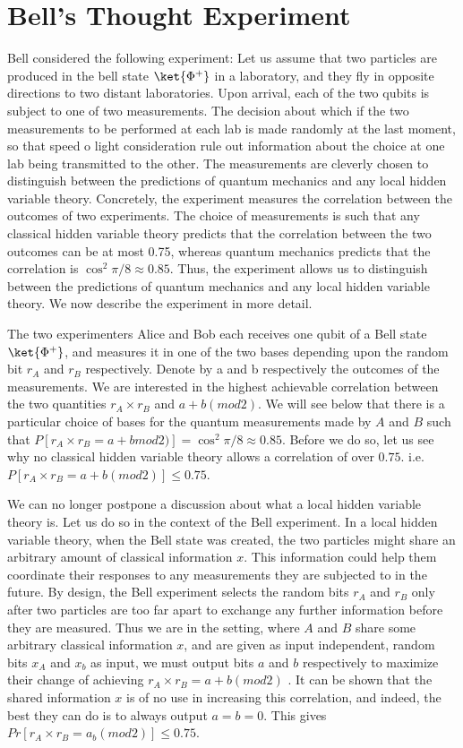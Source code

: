 \documentclass[12pt, oneside]{book}
\theoremstyle{definition}
\theoremstyle{definition}
\theoremstyle{remark}
\begin{document}
\section{Bell's Thought Experiment}
Bell considered the following experiment: Let us assume that two particles are produced in the bell state $\ket{\Phi^{+}}$ in a laboratory, and they fly in opposite directions to two distant laboratories. Upon arrival, each of the two qubits is subject to one of two measurements. The decision about which if the two measurements to be performed at each lab is made randomly at the last moment, so that speed o light consideration rule out information about the choice at one lab being transmitted to the other. The measurements are cleverly chosen to distinguish between the predictions of quantum mechanics and any local hidden variable theory. Concretely, the experiment measures the correlation between the outcomes of two experiments. The choice of measurements is such that any classical hidden variable theory predicts that the correlation between the two outcomes can be at most 0.75, whereas quantum mechanics predicts that the correlation is $\cos^2 \pi/8 \approx 0.85$. Thus, the experiment allows us to distinguish between the predictions of quantum mechanics and any local hidden variable theory. We now describe the experiment in more detail. 

The two experimenters Alice and Bob each receives one qubit of a Bell state $\ket{\Phi^{+}}$, and measures it in one of the two bases depending upon the random bit $r_A$ and $r_B$ respectively. Denote by a and b respectively the outcomes of the measurements. We are interested in the highest achievable correlation between the two quantities $r_A \times r_B$ and $a+b(mod 2)$. We will see below that there is a particular choice of bases for the quantum measurements made by $A$ and $B$ such that $P[r_A\times r_B=a+bmod2)]=\cos^2 \pi/8 \approx 0.85$. Before we do so, let us see why no classical hidden variable theory allows a correlation of over $0.75$. i.e. $P[r_A \times r_B = a+b(mod2)]\leq 0.75$. 

We can no longer postpone a discussion about what a local hidden variable theory is. Let us do so in the context of the Bell experiment. In a local hidden variable theory, when the Bell state was created, the two particles might share an arbitrary amount of classical information $x$. This information could help them coordinate their responses to any measurements they are subjected to in the future. By design, the Bell experiment selects the random bits $r_A$ and $r_B$ only after two particles are too far apart to exchange any further information before they are measured. Thus we are in the setting, where $A$ and $B$ share some arbitrary classical information $x$, and are given as input independent, random bits $x_A$ and $x_b$ as input, we must output bits $a$ and $b$ respectively to maximize their change of achieving $r_A \times r_B = a+b(mod2)$ . It can be shown that the shared information $x$ is of no use in increasing this correlation, and indeed, the best they can do is to always output $a=b=0$. This gives $Pr[r_A \times r_B =a_b(mod2)]\leq 0.75$.
\end{document}
